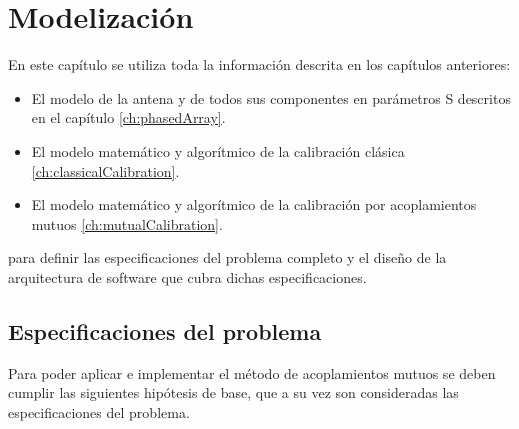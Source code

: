 \chapter{Modelización}
\label{ch:modelizacion}


En este capítulo se utiliza toda la información descrita en los capítulos anteriores:
\begin{itemize}
	\item El modelo de la antena y de todos sus componentes en parámetros S descritos en el capítulo \ref{ch:phasedArray}.
	\item El modelo matemático y algorítmico de la calibración clásica \ref{ch:classicalCalibration}.
	\item El modelo matemático y algorítmico de la calibración por acoplamientos mutuos \ref{ch:mutualCalibration}.
\end{itemize}
para definir las especificaciones del problema completo y el diseño de la arquitectura de software que cubra dichas especificaciones. 


\section{Especificaciones del problema} \label{sc:specifications}

Para poder aplicar e implementar el método de acoplamientos mutuos se deben cumplir las siguientes hipótesis de base, que a su
vez son consideradas las especificaciones del problema.

